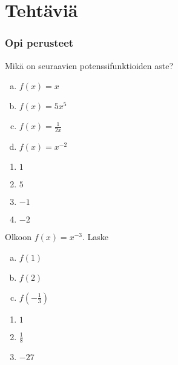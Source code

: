 


\section*{Tehtäviä}

\subsubsection*{Opi perusteet}

\begin{tehtava}
Mikä on seuraavien potenssifunktioiden aste?
\begin{enumerate}[a)]
\item $f(x) = x$
\item $f(x) = 5x^5$
\item $f(x) = \frac{1}{2x}$
\item $f(x) = x^{-2}$
\end{enumerate}
\begin{vastaus}
\begin{enumerate}
\item $1$
\item $5$
\item $-1$
\item $-2$
\end{enumerate}
\end{vastaus}
\end{tehtava}

\begin{tehtava}
Olkoon $f(x)=x^{-3}$. Laske
\begin{enumerate}[a)]
\item $f(1)$
\item $f(2)$
\item $f(-\frac{1}{3})$
\end{enumerate}
\begin{vastaus}
\begin{enumerate}
\item $1$
\item $\frac{1}{8}$
\item $-27$
\end{enumerate}
\end{vastaus}
\end{tehtava}

